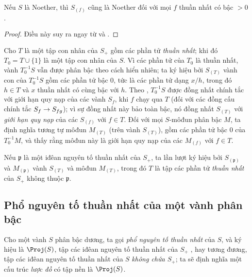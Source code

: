 \documentclass[oneside,10pt]{amsart}
\makeatletter
\newcommand{\ega@arrow}[2]{\mathchoice{#1}{#2}{#2}{#2}}
\renewcommand{\to}{\ega@arrow{\longrightarrow}{\rightarrow}}
\let\EGAOriginalLabel\label
\renewcommand{\label}[1]{\phantomsection\EGAOriginalLabel{#1}}
\makeatother
\begin{document}
\begin{corollary}[2.2.6]
\label{II.2.2.6}
Nếu $S$ là Noether, thì $S_{(f)}$ cũng là Noether đối với mọi $f$ thuần nhất có bậc $>0$.
\end{corollary}

\begin{proof}
Điều này suy ra ngay từ  và .
\end{proof}

\begin{env}[2.2.7]
\label{II.2.2.7}
Cho $T$ là một tập con nhân của $S_+$ gồm các phần tử \emph{thuần nhất}; khi đó $T_0=T\cup\{1\}$ là một tập con nhân của $S$.
Vì các phần tử của $T_0$ là thuần nhất, vành $T_0^{-1}S$ vẫn được phân bậc theo cách hiển nhiên; ta ký hiệu bởi $S_{(T)}$ vành con của $T_0^{-1}S$ gồm các phần tử bậc $0$, tức là các phần tử dạng $x/h$, trong đó $h\in T$ và $x$ thuần nhất có cùng bậc với $h$.
Theo , $T_0^{-1}S$ được đồng nhất chính tắc với giới hạn quy nạp của các vành $S_f$, khi $f$ chạy qua $T$ (đối với các đồng cấu chính tắc $S_f\to S_{fg}$); vì sự đồng nhất này bảo toàn bậc, nó đồng nhất $S_{(T)}$ với \emph{giới hạn quy nạp} của các $S_{(f)}$ với $f\in T$.
Đối với mọi $S$-môđun phân bậc $M$, ta định nghĩa tương tự môđun $M_{(T)}$ (trên vành $S_{(T)}$), gồm các phần tử bậc $0$ của $T_0^{-1}M$, và thấy rằng môđun này là giới hạn quy nạp của các $M_{(f)}$ với $f\in T$.

Nếu $\mathfrak{p}$ là một iđêan nguyên tố thuần nhất của $S_+$, ta lần lượt ký hiệu bởi $S_{(\mathfrak{p})}$ và $M_{(\mathfrak{p})}$ vành $S_{(T)}$ và môđun $M_{(T)}$, trong đó $T$ là tập các phần tử \emph{thuần nhất} của $S_+$ không thuộc $\mathfrak{p}$.
\end{env}

\subsection{Phổ nguyên tố thuần nhất của một vành phân bậc}
\label{subsection:II.2.3}

\begin{env}[2.3.1]
\label{II.2.3.1}
Cho một vành $S$ phân bậc dương, ta gọi \emph{phổ nguyên tố thuần nhất} của $S$, và ký hiệu là $\Proj(S)$, tập các iđêan nguyên tố thuần nhất của $S_+$ , hay tương đương, tập các iđêan nguyên tố thuần nhất của $S$ \emph{không chứa $S_+$}; ta sẽ định nghĩa một cấu trúc \emph{lược đồ} có tập nền là $\Proj(S)$.
\end{env}
\end{document}
